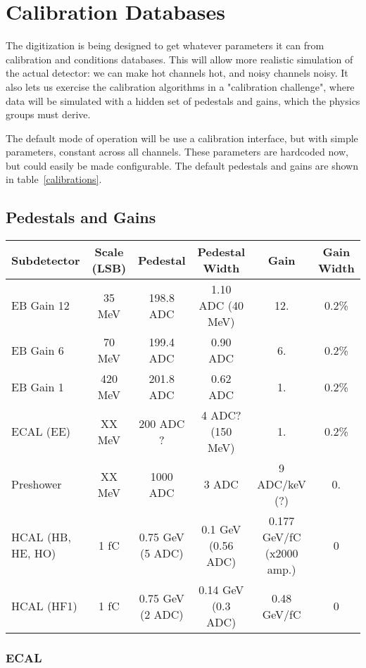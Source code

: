 \documentclass{cmspaper}
\begin{document}
\section{Calibration Databases}

The digitization is being designed to get whatever parameters it can from calibration 
and conditions databases.  This will allow more realistic simulation of the actual
detector: we can make hot channels hot, and noisy channels noisy.  It also lets
us exercise the calibration algorithms in a "calibration challenge", where data
will be simulated with a hidden set of pedestals and gains, which the physics
groups must derive.

The default mode of operation will be use a calibration interface, but with
simple parameters, constant across all channels.  These parameters are hardcoded
now, but could easily be made configurable.  The default pedestals and gains
are shown in table~\ref{calibrations}.

\subsection{Pedestals and Gains}
\begin{center}
      \begin{tabular}{|l|c|c|c|c|c|} \hline
       \label{calibrations}
         Subdetector & Scale (LSB) & Pedestal & Pedestal Width & Gain & Gain Width \\ \hline
         EB Gain 12 & 35 MeV & 198.8 ADC & 1.10 ADC (40 MeV) & 12. & 0.2\%\\ 
         EB Gain  6 & 70 MeV & 199.4 ADC & 0.90 ADC  & 6. & 0.2\%\\ 
         EB Gain  1 & 420 MeV & 201.8 ADC & 0.62 ADC  & 1. & 0.2\%\\
         ECAL (EE) & XX MeV & 200 ADC ?  & 4 ADC? (150 MeV) & 1.  & 0.2\%\\ 
         Preshower &  XX MeV &  1000 ADC  & 3 ADC  & 9 ADC/keV (?) & 0. \\ 
         HCAL (HB, HE, HO) & 1 fC & 0.75 GeV  (5 ADC) & 0.1 GeV (0.56 ADC) &  0.177 GeV/fC (x2000 amp.) & 0\\
         HCAL (HF1) & 1 fC & 0.75 GeV (2 ADC) & 0.14 GeV (0.3 ADC)&  0.48 GeV/fC  & 0  \\ \hline
      \end{tabular}
\end{center}

\subsubsection{ECAL}
\end{document}

